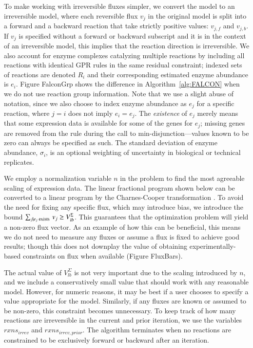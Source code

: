 To make working with irreversible fluxes simpler, we convert the model
to an irreversible model, where each reversible flux $v_j$ in the
original model is split into a forward and a backward reaction that take
strictly positive values: $v_{j,f}$ and $v_{j,b}$. If $v_j$ is
specified without a forward or backward subscript and it is in the
context of an irreversible model, this implies that the reaction
direction is irreversible. We also account for enzyme complexes
catalyzing multiple reactions by including all reactions with identical
GPR rules in the same residual
constraint; indexed sets of reactions are denoted $R_i$ and their
corresponding estimated enzyme abundance is $e_i$. Figure FalconGrp 
shows the difference in Algorithm~\ref{alg:FALCON} when we do not 
use reaction group information. Note that we use a
slight abuse of notation, since we also choose to index enzyme
abundance as $e_j$ for a specific reaction, where $j = i$ does not
imply $e_i = e_j$. The \emph{existence} of $e_j$ merely means that
some expression data is available for some of the genes for $e_j$;
missing genes are removed from the rule during the call to
min-disjunction---values known to be zero can always be specified as
such. The standard deviation of enzyme abundance, $\sigma_i$, is an
optional weighting of uncertainty in biological or technical
replicates.

We employ a normalization variable $n$ in the problem to find the most
agreeable scaling of expression data. The linear fractional program shown below can be
converted to a linear program by the Charnes-Cooper transformation
\citep{Boyd2004}. To avoid the need for fixing any specific flux, which
may introduce bias, we introduce the bound $\sum_{j \mid e_j 
\textnormal{ exists }} v_j \geq V_{lb}^{\Sigma}$. This guarantees that
the optimization problem will yield a non-zero flux vector. As an
example of how this can be beneficial, this means we do not need to
measure any fluxes or assume a flux is fixed to achieve good results;
though this does not downplay the value of obtaining
experimentally-based constraints on flux when available (Figure
FluxBars).

The actual
value of $V_{lb}^{\Sigma}$ is not very important due to the scaling
introduced by $n$, and we include a conservatively small value that
should work with any reasonable model. However, for numeric reasons,
it may be best if a user chooses to specify a value appropriate for
the model. Similarly, if any fluxes are known or assumed to be
non-zero, this constraint becomes unnecessary. To keep track of how
many reactions are irreversible in the current and prior iteration, we
use the variables $rxns_{irrev}$ and
$rxns_{irrev,prior}$. The algorithm terminates when no reactions are
constrained to be exclusively forward or backward after an iteration.

